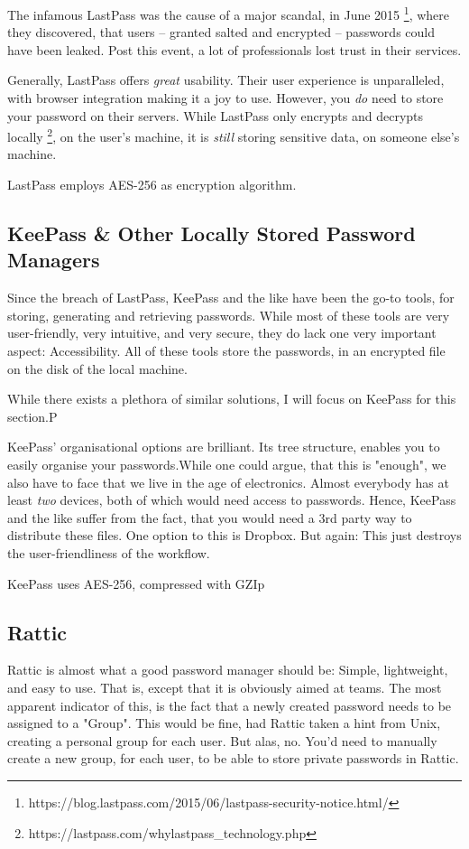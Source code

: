 			The infamous LastPass was the cause of a major scandal, in June 2015 \footnote{https://blog.lastpass.com/2015/06/lastpass-security-notice.html/}, where they discovered, that users -- granted salted and encrypted -- passwords could have been leaked. Post this event, a lot of professionals lost trust in their services.

			Generally, LastPass offers \emph{great} usability. Their user experience is unparalleled, with browser integration making it a joy to use. However, you \emph{do} need to store your password on their servers. While LastPass only encrypts and decrypts locally \footnote{https://lastpass.com/whylastpass\_technology.php}, on the user's machine, it is \emph{still} storing sensitive data, on someone else's machine.

			LastPass employs AES-256 as encryption algorithm.










		\subsection{KeePass \& Other Locally Stored Password Managers}
			Since the breach of LastPass, KeePass and the like have been the go-to tools, for storing, generating and retrieving passwords. While most of these tools are very user-friendly, very intuitive, and very secure, they do lack one very important aspect: Accessibility. All of these tools store the passwords, in an encrypted file on the disk of the local machine.

			While there exists a plethora of similar solutions, I will focus on KeePass for this section.P

			KeePass' organisational options are brilliant. Its tree structure, enables you to easily organise your passwords.While one could argue, that this is "enough", we also have to face that we live in the age of electronics. Almost everybody has at least \emph{two} devices, both of which would need access to passwords. Hence, KeePass and the like suffer from the fact, that you would need a 3rd party way to distribute these files. One option to this is Dropbox. But again: This just destroys the user-friendliness of the workflow.

			KeePass uses AES-256, compressed with GZIp


		\subsection{Rattic}
			Rattic is almost what a good password manager should be: Simple, lightweight, and easy to use. That is, except that it is obviously aimed at teams. The most apparent indicator of this, is the fact that a newly created password needs to be assigned to a "Group". This would be fine, had Rattic taken a hint from Unix, creating a personal group for each user. But alas, no. You'd need to manually create a new group, for each user, to be able to store private passwords in Rattic.

